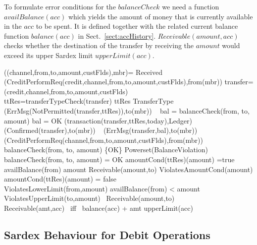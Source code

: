 To formulate error conditions for the $balanceCheck$ we need a function $availBalance(acc)$ which yields the amount of money that is currently available in the $acc$ to be spent. It is defined together with the related current balance function $balance(acc)$ in Sect.~\ref{sect:accHistory}. $Receivable(amount,acc)$ checks whether the destination of the transfer by receiving the $amount$ would exceed its upper Sardex limit $upperLimit(acc)$.


\begin{asm}
((channel,from,to,amount,custFlds),mbr)=\+
\IF Received
   (CreditPerformReq(credit,channel,from,to,amount,custFlds),from(mbr)) \THEN \+  \LET transfer=(credit,channel,from,to,amount,custFlds) \\
    \LET ttRes=transferTypeCheck(transfer)  \+
      \IF ttRes \not \in TransferType \THEN \+ (ErrMsg(NotPermitted(transfer,ttRes)),to(mbr))\-
       \ELSE~ 
       \LET bal = balanceCheck(from, to, amount) \+
              \IF bal = OK \+
                 \THEN \+
                      (transaction(transfer,ttRes,today),Ledger)\\
                      (Confirmed(transfer),to(mbr))\-
                \ELSE ~ (ErrMsg(transfer,bal),to(mbr))\dec\dec\-
    (CreditPerformReq(channel,from,to,amount,custFlds),from(mbr)) \dec\-
\WHERE \+
balanceCheck(from, to, amount) \in \{OK\} 
                  \cup Powerset(BalanceViolation)\\
balanceCheck(from, to, amount) = OK \IFF 
         amountCond(ttRes)(amount) =true \AND \+
         availBalance(from) \geq amount  \AND Receivable(amount,to)\-
ViolatesAmountCond(amount) \IF  amountCond(ttRes)(amount) = false \\
ViolatesLowerLimit(from,amount) \IF availBalance(from) < amount \\
ViolatesUpperLimit(to,amount) \IF ~\NOT Receivable(amount,to) \\
 Receivable(amt,acc) \mbox{ iff } balance(acc) + amt \leq upperLimit(acc)
\end{asm}



\subsection{Sardex Behaviour for Debit Operations}
\label{sec:debitop}

